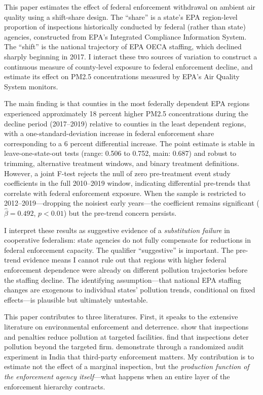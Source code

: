 \documentclass[12pt]{article}
\begin{document}
This paper estimates the effect of federal enforcement withdrawal on ambient air quality using a shift-share design. The ``share'' is a state's EPA region-level proportion of inspections historically conducted by federal (rather than state) agencies, constructed from EPA's Integrated Compliance Information System. The ``shift'' is the national trajectory of EPA OECA staffing, which declined sharply beginning in 2017. I interact these two sources of variation to construct a continuous measure of county-level exposure to federal enforcement decline, and estimate its effect on PM2.5 concentrations measured by EPA's Air Quality System monitors.

The main finding is that counties in the most federally dependent EPA regions experienced approximately 18 percent higher PM2.5 concentrations during the decline period (2017--2019) relative to counties in the least dependent regions, with a one-standard-deviation increase in federal enforcement share corresponding to a 6 percent differential increase. The point estimate is stable in leave-one-state-out tests (range: 0.506 to 0.752, main: 0.687) and robust to trimming, alternative treatment windows, and binary treatment definitions. However, a joint F-test rejects the null of zero pre-treatment event study coefficients in the full 2010--2019 window, indicating differential pre-trends that correlate with federal enforcement exposure. When the sample is restricted to 2012--2019---dropping the noisiest early years---the coefficient remains significant ($\hat{\beta} = 0.492$, $p < 0.01$) but the pre-trend concern persists.

I interpret these results as suggestive evidence of a \textit{substitution failure} in cooperative federalism: state agencies do not fully compensate for reductions in federal enforcement capacity. The qualifier ``suggestive'' is important. The pre-trend evidence means I cannot rule out that regions with higher federal enforcement dependence were already on different pollution trajectories before the staffing decline. The identifying assumption---that national EPA staffing changes are exogenous to individual states' pollution trends, conditional on fixed effects---is plausible but ultimately untestable.

This paper contributes to three literatures. First, it speaks to the extensive literature on environmental enforcement and deterrence. \citet{shimshack2005mercury} show that inspections and penalties reduce pollution at targeted facilities. \citet{gray2005effectiveness} find that inspections deter pollution beyond the targeted firm. \citet{duflo2018truth} demonstrate through a randomized audit experiment in India that third-party enforcement matters. My contribution is to estimate not the effect of a marginal inspection, but the \textit{production function of the enforcement agency itself}---what happens when an entire layer of the enforcement hierarchy contracts.
\end{document}
